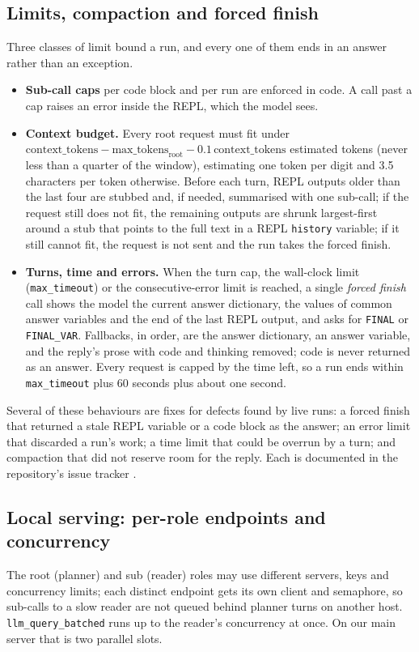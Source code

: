 \documentclass[11pt]{article}
\newcommand{\code}[1]{\texttt{#1}}
\begin{document}
\subsection{Limits, compaction and forced finish}
Three classes of limit bound a run, and every one of them ends in an answer rather
than an exception.

\begin{itemize}[leftmargin=*]
\item \textbf{Sub-call caps} per code block and per run are enforced in code. A call
  past a cap raises an error inside the REPL, which the model sees.
\item \textbf{Context budget.} Every root request must fit under
  $\text{context\_tokens} - \text{max\_tokens}_{\text{root}} -
  0.1\,\text{context\_tokens}$ estimated tokens (never less than a quarter of the
  window), estimating one token per digit and 3.5 characters per token otherwise.
  Before each turn, REPL outputs older than the last four are stubbed and, if
  needed, summarised with one sub-call; if the request still does not fit, the
  remaining outputs are shrunk largest-first around a stub that points to the full
  text in a REPL \code{history} variable; if it still cannot fit, the request is not
  sent and the run takes the forced finish.
\item \textbf{Turns, time and errors.} When the turn cap, the wall-clock limit
  (\code{max\_timeout}) or the consecutive-error limit is reached, a single
  \emph{forced finish} call shows the model the current answer dictionary, the
  values of common answer variables and the end of the last REPL output, and asks
  for \code{FINAL} or \code{FINAL\_VAR}. Fallbacks, in order, are the answer
  dictionary, an answer variable, and the reply's prose with code and thinking
  removed; code is never returned as an answer. Every request is capped by the time
  left, so a run ends within \code{max\_timeout} plus 60 seconds plus about one
  second.
\end{itemize}

Several of these behaviours are fixes for defects found by live runs: a forced
finish that returned a stale REPL variable or a code block as the answer; an
error limit that discarded a run's work; a time limit that could be overrun by a
turn; and compaction that did not reserve room for the reply. Each is documented
in the repository's issue tracker \citep{reclamo}.

\subsection{Local serving: per-role endpoints and concurrency}
The root (planner) and sub (reader) roles may use different servers, keys and
concurrency limits; each distinct endpoint gets its own client and semaphore, so
sub-calls to a slow reader are not queued behind planner turns on another host.
\code{llm\_query\_batched} runs up to the reader's concurrency at once. On our main
server that is two parallel slots.
\end{document}
